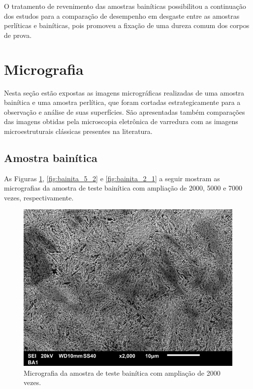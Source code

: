 \documentclass[
12pt,
openany, %
oneside, %
a4paper,			
english,			
brazil			        %
]{abntbibufjf}
\begin{document}
	O tratamento de revenimento das amostras bainíticas possibilitou a continuação dos estudos para a comparação de desempenho em desgaste entre as amostras perlíticas e bainíticas, pois promoveu a fixação de uma dureza comum dos corpos de prova.

\pagebreak
\section{Micrografia}
\label{sec:micrografia}

	Nesta seção estão expostas as imagens micrográficas realizadas de uma amostra bainítica e uma amostra perlítica, que foram cortadas estrategicamente para a observação e análise de suas superfícies. São apresentadas também comparações das imagens obtidas pela microscopia eletrônica de varredura com as imagens microestruturais clássicas presentes na literatura.

\subsection{Amostra bainítica}
\label{sec:micrografia_bainita}

	As Figuras \ref{fig:bainita_10_2}, \ref{fig:bainita_5_2} e \ref{fig:bainita_2_1} a seguir mostram as micrografias da amostra de teste bainítica com ampliação de 2000, 5000 e 7000 vezes, respectivamente.
	
	\begin{figure}[H]
		\centering
		\includegraphics[width=1\textwidth]{bainita_10_2}
		\caption{Micrografia da amostra de teste bainítica com ampliação de 2000 vezes.}
		\label{fig:bainita_10_2}
	\end{figure}
	
\end{document}
